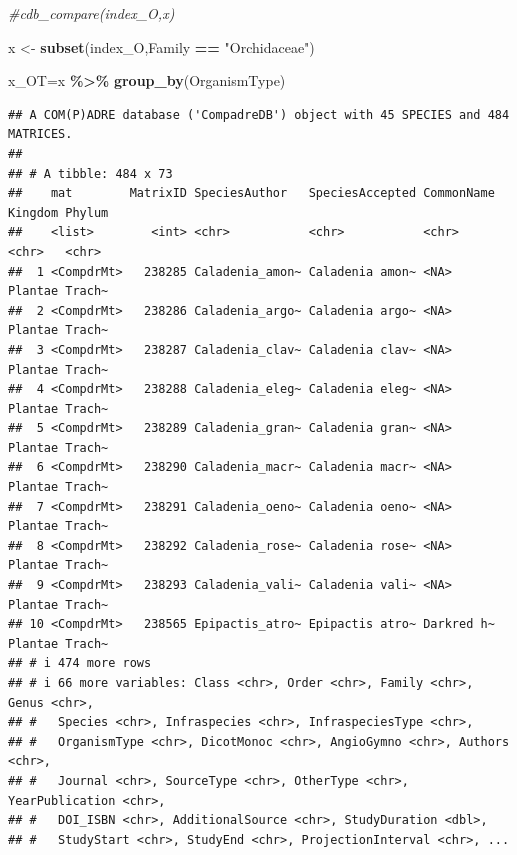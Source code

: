 \documentclass[
]{book}
\newenvironment{Shaded}{\begin{snugshade}}{\end{snugshade}}
\newcommand{\CommentTok}[1]{\textcolor[rgb]{0.56,0.35,0.01}{\textit{#1}}}
\newcommand{\ConstantTok}[1]{\textcolor[rgb]{0.56,0.35,0.01}{#1}}
\newcommand{\FunctionTok}[1]{\textcolor[rgb]{0.13,0.29,0.53}{\textbf{#1}}}
\newcommand{\NormalTok}[1]{#1}
\newcommand{\OtherTok}[1]{\textcolor[rgb]{0.56,0.35,0.01}{#1}}
\newcommand{\SpecialCharTok}[1]{\textcolor[rgb]{0.81,0.36,0.00}{\textbf{#1}}}
\newcommand{\StringTok}[1]{\textcolor[rgb]{0.31,0.60,0.02}{#1}}
\theoremstyle{definition}
\theoremstyle{definition}
\theoremstyle{definition}
\theoremstyle{definition}
\theoremstyle{remark}
\begin{document}
\begin{Shaded}
\begin{Highlighting}[]
\CommentTok{\#cdb\_compare(index\_O,x)}


\NormalTok{x }\OtherTok{\textless{}{-}} \FunctionTok{subset}\NormalTok{(index\_O,Family }\SpecialCharTok{==} \StringTok{"Orchidaceae"}\NormalTok{)}

\NormalTok{x\_OT}\OtherTok{=}\NormalTok{x }\SpecialCharTok{\%\textgreater{}\%} 
  \FunctionTok{group\_by}\NormalTok{(OrganismType)}
\end{Highlighting}
\end{Shaded}

\begin{Shaded}
\end{Shaded}

\begin{verbatim}
## A COM(P)ADRE database ('CompadreDB') object with 45 SPECIES and 484 MATRICES.
## 
## # A tibble: 484 x 73
##    mat        MatrixID SpeciesAuthor   SpeciesAccepted CommonName Kingdom Phylum
##    <list>        <int> <chr>           <chr>           <chr>      <chr>   <chr> 
##  1 <CompdrMt>   238285 Caladenia_amon~ Caladenia amon~ <NA>       Plantae Trach~
##  2 <CompdrMt>   238286 Caladenia_argo~ Caladenia argo~ <NA>       Plantae Trach~
##  3 <CompdrMt>   238287 Caladenia_clav~ Caladenia clav~ <NA>       Plantae Trach~
##  4 <CompdrMt>   238288 Caladenia_eleg~ Caladenia eleg~ <NA>       Plantae Trach~
##  5 <CompdrMt>   238289 Caladenia_gran~ Caladenia gran~ <NA>       Plantae Trach~
##  6 <CompdrMt>   238290 Caladenia_macr~ Caladenia macr~ <NA>       Plantae Trach~
##  7 <CompdrMt>   238291 Caladenia_oeno~ Caladenia oeno~ <NA>       Plantae Trach~
##  8 <CompdrMt>   238292 Caladenia_rose~ Caladenia rose~ <NA>       Plantae Trach~
##  9 <CompdrMt>   238293 Caladenia_vali~ Caladenia vali~ <NA>       Plantae Trach~
## 10 <CompdrMt>   238565 Epipactis_atro~ Epipactis atro~ Darkred h~ Plantae Trach~
## # i 474 more rows
## # i 66 more variables: Class <chr>, Order <chr>, Family <chr>, Genus <chr>,
## #   Species <chr>, Infraspecies <chr>, InfraspeciesType <chr>,
## #   OrganismType <chr>, DicotMonoc <chr>, AngioGymno <chr>, Authors <chr>,
## #   Journal <chr>, SourceType <chr>, OtherType <chr>, YearPublication <chr>,
## #   DOI_ISBN <chr>, AdditionalSource <chr>, StudyDuration <dbl>,
## #   StudyStart <chr>, StudyEnd <chr>, ProjectionInterval <chr>, ...
\end{verbatim}
\end{document}
